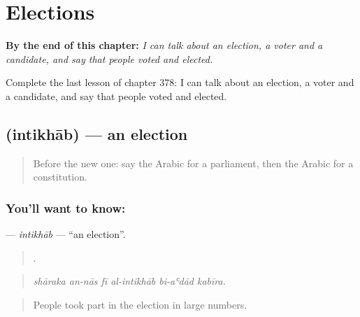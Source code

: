 
\chapter{Elections}
\label{ch:ar-elections}

\begin{chapteropening}
\textbf{By the end of this chapter:} \emph{I can talk about an election, a voter and a candidate, and say that people voted and elected.}

Complete the last lesson of chapter 378: I can talk about an election, a voter and a candidate, and say that people voted and elected.
\end{chapteropening}

\section[\texorpdfstring{\ar{انتخاب} (intikhāb)}{انتخاب (intikhāb)}]{ (intikhāb) — an election}

\label{lesson:AR-C378-intikhab}



\begin{quote}
Before the new one: say the Arabic for a parliament, then the Arabic for a constitution.
\end{quote}

\subsection*{You'll want to know: }
\textbf{} — \emph{intikhāb} — \textquotedblleft{}an election\textquotedblright{}.

\begin{quote}
     .
\end{quote}

\begin{quote}
\emph{shāraka an-nās fī al-intikhāb bi-aʿdād kabīra.}
\end{quote}

\begin{quote}
People took part in the election in large numbers.
\end{quote}

